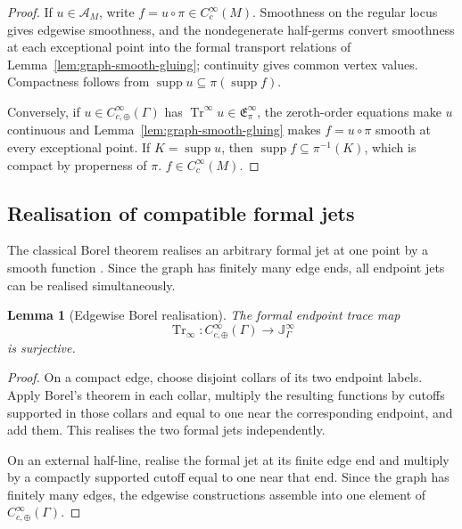 \documentclass[11pt]{article}
\theoremstyle{plain}
\newtheorem{lemma}[theorem]{Lemma}
\theoremstyle{definition}
\begin{document}
\begin{proof}
If \(u\in\mathcal A_M\), write \(f=u\circ\pi\in C_c^\infty(M)\). Smoothness on the regular locus gives edgewise smoothness, and the nondegenerate half-germs convert smoothness at each exceptional point into the formal transport relations of Lemma~\ref{lem:graph-smooth-gluing}; continuity gives common vertex values. Compactness follows from \(\operatorname{supp}u\subseteq\pi(\operatorname{supp}f)\).

Conversely, if \(u\in C_{c,\oplus}^\infty(\Gamma)\) has \(\operatorname{Tr}^\infty u\in\mathfrak E_\pi^\infty\), the zeroth-order equations make \(u\) continuous and Lemma~\ref{lem:graph-smooth-gluing} makes \(f=u\circ\pi\) smooth at every exceptional point. If \(K=\operatorname{supp}u\), then \(\operatorname{supp}f\subseteq\pi^{-1}(K)\), which is compact by properness of \(\pi\). \(f\in C_c^\infty(M)\).
\end{proof}

\subsection{Realisation of compatible formal jets}
\label{subsec:graph-formal-realisation}

The classical Borel theorem realises an arbitrary formal jet at one
point by a smooth function
\citep{Borel1895,Hormander2003AnalysisI}. Since the graph has finitely
many edge ends, all endpoint jets can be realised simultaneously.

\begin{lemma}[Edgewise Borel realisation]
\label{lem:edgewise-borel-realisation}
The formal endpoint trace map
\[
  \operatorname{Tr}_\infty:
  C_{c,\oplus}^\infty(\Gamma)
  \longrightarrow
  \mathbb J_\Gamma^\infty
\]
is surjective.
\end{lemma}

\begin{proof}
On a compact edge, choose disjoint collars of its two endpoint labels.
Apply Borel's theorem in each collar, multiply the resulting functions
by cutoffs supported in those collars and equal to one near the
corresponding endpoint, and add them. This realises the two formal jets
independently.

On an external half-line, realise the formal jet at its finite edge end
and multiply by a compactly supported cutoff equal to one near that
end. Since the graph has finitely many edges, the edgewise
constructions assemble into one element of
\(C_{c,\oplus}^\infty(\Gamma)\).
\end{proof}
\end{document}
